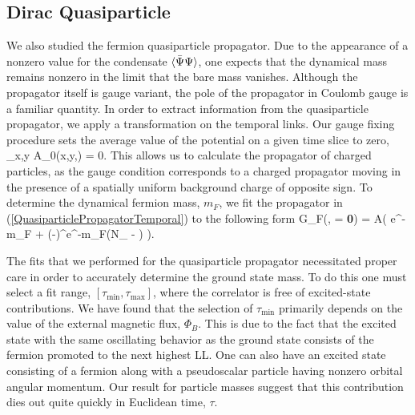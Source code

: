 \documentclass[aps,prd,twocolumn,showpacs,superscriptaddress,groupedaddress]{revtex4}  %
\begin{document}
\subsection{\label{sec:DiracQuasi}Dirac Quasiparticle}
We also studied the fermion quasiparticle propagator. Due to the appearance of a nonzero value for the condensate ${\langle {\bar \Psi} \Psi \rangle}$, one expects that the dynamical mass remains nonzero in the limit that the bare mass vanishes. 
Although the propagator itself is gauge variant, the pole of the propagator in Coulomb gauge is a familiar quantity. In order to extract information from the quasiparticle propagator, we apply a transformation on the temporal links. Our gauge fixing procedure sets the average value of the potential on a given time slice to zero, 
\beq
\sum_{x,y} A_0(x,y,\tau) = 0.
\eeq
This allows us to calculate the propagator of charged particles, as the gauge condition corresponds to a charged propagator moving in the presence of a spatially uniform background charge of opposite sign.
To determine the dynamical fermion mass, $m_F$, we fit the propagator in (\ref{QuasiparticlePropagatorTemporal}) to the following form
\beq
\label{FermFitForm} 
G_F(\tau,  = {\bf 0}) = A\left( e^{-m_F\tau} + (-)^{\tau}e^{-m_F(N_{\tau} - \tau)} \right).
\eeq

The fits that we performed for the quasiparticle propagator necessitated proper care in order to accurately determine the ground state mass. To do this one must select a fit range, $[ \tau_{\text{min}}, \tau_{\text{max}}]$, where the correlator is free of excited-state contributions. We have found that the selection of $\tau_{\text{min}}$ primarily depends on the value of the external magnetic flux, $\Phi_B$. This is due to the fact that the excited state with the same oscillating behavior as the ground state consists of the fermion promoted to the next highest LL. One can also have an excited state consisting of a fermion along with a pseudoscalar particle having nonzero orbital angular momentum. Our result for particle masses suggest that this contribution dies out quite quickly in Euclidean time, $\tau$.
\end{document}
